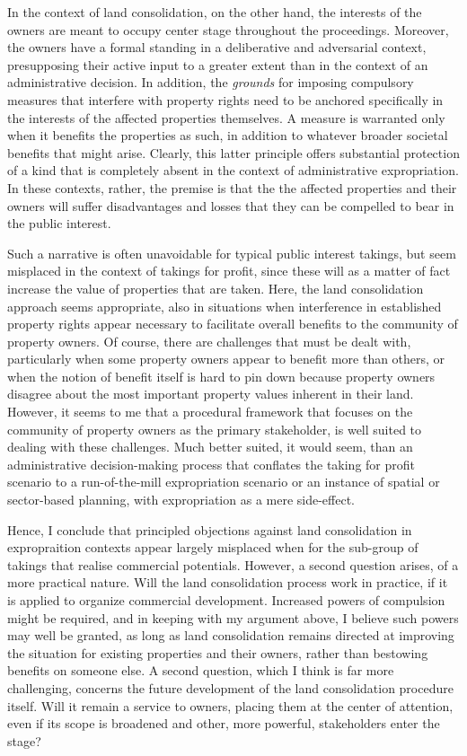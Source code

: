 In the context of land consolidation, on the other hand, the interests of the owners are meant to occupy center stage throughout the proceedings. Moreover, the owners have a formal standing in a deliberative and adversarial context, presupposing their active input to a greater extent than in the context of an administrative decision. In addition, the {\it grounds} for imposing compulsory measures that interfere with property rights need to be anchored specifically in the interests of the affected properties themselves. A measure is warranted only when it benefits the properties as such, in addition to whatever broader societal benefits that might arise. Clearly, this latter principle offers substantial protection of a kind that is completely absent in the context of administrative expropriation. In these contexts, rather, the premise is that the the affected properties and their owners will suffer disadvantages and losses that they can be compelled to bear in the public interest.

Such a narrative is often unavoidable for typical public interest takings, but seem misplaced in the context of takings for profit, since these will as a matter of fact increase the value of properties that are taken. Here, the land consolidation approach seems appropriate, also in situations when interference in established property rights appear necessary to facilitate overall benefits to the community of property owners. Of course, there are challenges that must be dealt with, particularly when some property owners appear to benefit more than others, or when the notion of benefit itself is hard to pin down because property owners disagree about the most important property values inherent in their land. However, it seems to me that a procedural framework that focuses on the community of property owners as the primary stakeholder, is well suited to dealing with these challenges. Much better suited, it would seem, than an administrative decision-making process that conflates the taking for profit scenario to a run-of-the-mill expropriation scenario or an instance of spatial or sector-based planning, with expropriation as a mere side-effect.

Hence, I conclude that principled objections against land consolidation in expropraition contexts appear largely misplaced when for the sub-group of takings that realise commercial potentials. However, a second question arises, of a more practical nature. Will the land consolidation process work in practice, if it is applied to organize commercial development. Increased powers of compulsion might be required, and in keeping with my argument above, I believe such powers may well be granted, as long as land consolidation remains directed at improving the situation for existing properties and their owners, rather than bestowing benefits on someone else. A second question, which I think is far more challenging, concerns the future development of the land consolidation procedure itself. Will it remain a service to owners, placing them at the center of attention, even if its scope is broadened and other, more powerful, stakeholders enter the stage?

